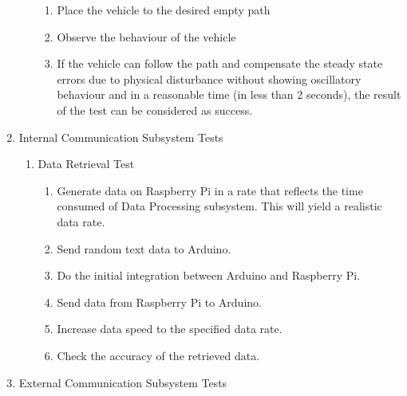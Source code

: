 \documentclass[a4paper,12pt]{article}
\begin{document}
\begin{enumerate}
\begin{enumerate}
\begin{enumerate}
\item Place the vehicle to the desired empty path   

\item Observe the behaviour of the vehicle  

\item If the vehicle can follow the path and compensate the steady state errors due to physical disturbance without showing oscillatory behaviour and in a reasonable time (in less than 2 seconds), the result of the test can be considered as success.  

\end{enumerate}


\end{enumerate}




\item {Internal Communication Subsystem Tests}

\begin{enumerate}

\item Data Retrieval Test

\begin{enumerate}

\item Generate data on Raspberry Pi in a rate that reflects the time consumed of Data Processing subsystem. This will yield a realistic data rate.  

\item Send random text data to Arduino.  

\item Do the initial integration between Arduino and Raspberry Pi.  

\item Send data from Raspberry Pi to Arduino.  

\item Increase data speed to the specified data rate.  

\item Check the accuracy of the retrieved data. 

\end{enumerate}

\end{enumerate}





\item {External Communication Subsystem Tests}



\end{enumerate}
\end{document}
